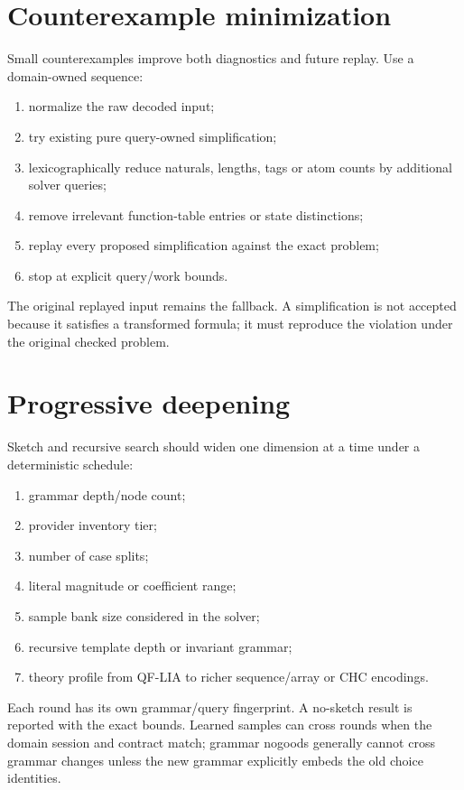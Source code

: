 \documentclass[11pt,oneside]{report}
\begin{document}
\section{Counterexample minimization}

Small counterexamples improve both diagnostics and future replay. Use a domain-owned sequence:

\begin{enumerate}[leftmargin=2em]
\item normalize the raw decoded input;
\item try existing pure query-owned simplification;
\item lexicographically reduce naturals, lengths, tags or atom counts by additional solver queries;
\item remove irrelevant function-table entries or state distinctions;
\item replay every proposed simplification against the exact problem;
\item stop at explicit query/work bounds.
\end{enumerate}

The original replayed input remains the fallback. A simplification is not accepted because it satisfies a transformed formula; it must reproduce the violation under the original checked problem.

\section{Progressive deepening}

Sketch and recursive search should widen one dimension at a time under a deterministic schedule:

\begin{enumerate}[leftmargin=2em]
\item grammar depth/node count;
\item provider inventory tier;
\item number of case splits;
\item literal magnitude or coefficient range;
\item sample bank size considered in the solver;
\item recursive template depth or invariant grammar;
\item theory profile from QF-LIA to richer sequence/array or CHC encodings.
\end{enumerate}

Each round has its own grammar/query fingerprint. A no-sketch result is reported with the exact bounds. Learned samples can cross rounds when the domain session and contract match; grammar nogoods generally cannot cross grammar changes unless the new grammar explicitly embeds the old choice identities.
\end{document}
